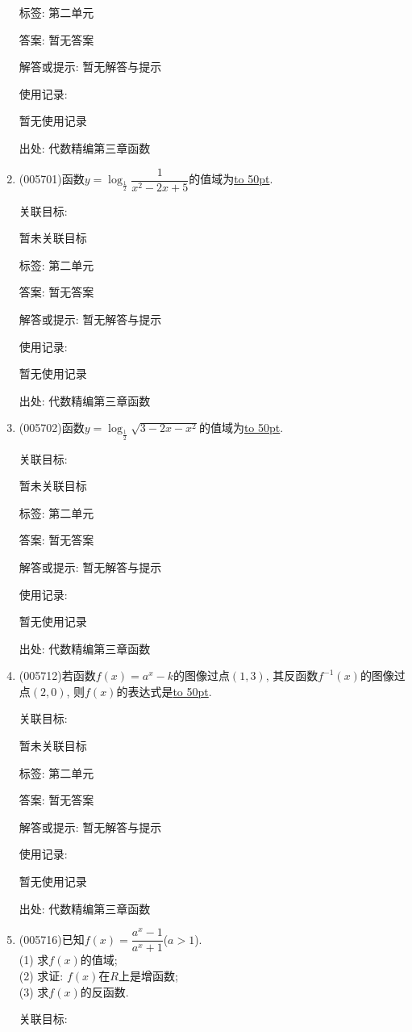 \documentclass[10pt,a4paper]{article}
\newcommand{\blank}[1]{\underline{\hbox to #1pt{}}}
\begin{document}
\begin{enumerate}[1.]
标签: 第二单元

答案: 暂无答案

解答或提示: 暂无解答与提示

使用记录:

暂无使用记录


出处: 代数精编第三章函数
\item { (005701)}函数$y=\log_{\frac 12}\dfrac 1{x^2-2x+5}$的值域为\blank{50}.


关联目标:

暂未关联目标



标签: 第二单元

答案: 暂无答案

解答或提示: 暂无解答与提示

使用记录:

暂无使用记录


出处: 代数精编第三章函数
\item { (005702)}函数$y=\log_{\frac 12}\sqrt {3-2x-x^2}$的值域为\blank{50}.


关联目标:

暂未关联目标



标签: 第二单元

答案: 暂无答案

解答或提示: 暂无解答与提示

使用记录:

暂无使用记录


出处: 代数精编第三章函数
\item { (005712)}若函数$f(x)=a^x-k$的图像过点$(1, 3)$, 其反函数$f^{-1}(x)$的图像过点$(2, 0)$, 则$f(x)$的表达式是\blank{50}.


关联目标:

暂未关联目标



标签: 第二单元

答案: 暂无答案

解答或提示: 暂无解答与提示

使用记录:

暂无使用记录


出处: 代数精编第三章函数
\item { (005716)}已知$f(x)=\dfrac{a^x-1}{a^x+1}$($a>1$).\\
(1) 求$f(x)$的值域;\\
(2) 求证: $f(x)$在$R$上是增函数;\\
(3) 求$f(x)$的反函数.


关联目标:


\end{enumerate}
\end{document}
